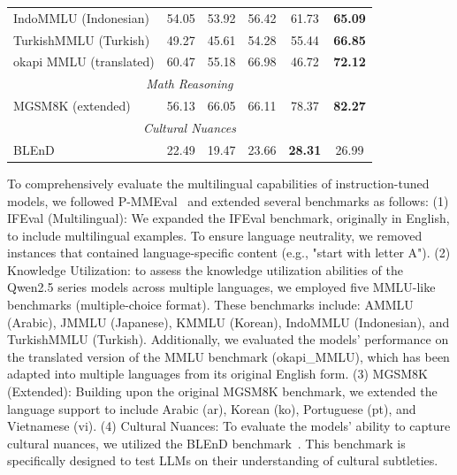 \begin{table}[t]
\begin{tabular}{@{}lccccc@{}}
IndoMMLU (Indonesian) & 54.05 & 53.92 & 56.42 & 61.73 & \textbf{65.09} \\

TurkishMMLU (Turkish) & 49.27 & 45.61 & 54.28 & 55.44 & \textbf{66.85} \\

okapi MMLU (translated) & 60.47 & 55.18 & 66.98 & 46.72 & \textbf{72.12} \\

\midrule

\multicolumn{6}{c}{\textit{Math Reasoning}} \\

\midrule

MGSM8K (extended) & 56.13 & 66.05 & 66.11 & 78.37 & \textbf{82.27} \\

\midrule

\multicolumn{6}{c}{\textit{Cultural Nuances}} \\

\midrule

BLEnD & 22.49 & 19.47 & 23.66 & \textbf{28.31} & 26.99 \\

\bottomrule

\end{tabular}

\end{table}

To comprehensively evaluate the multilingual capabilities of instruction-tuned models, we followed P-MMEval~\citep{pmmeval} and extended several benchmarks as follows:
(1) IFEval (Multilingual): We expanded the IFEval benchmark, originally in English, to include multilingual examples. To ensure language neutrality, we removed instances that contained language-specific content (e.g., "start with letter A"). 
(2) Knowledge Utilization: to assess the knowledge utilization abilities of the Qwen2.5 series models across multiple languages, we employed five MMLU-like benchmarks (multiple-choice format). These benchmarks include: AMMLU (Arabic), JMMLU (Japanese), KMMLU (Korean), IndoMMLU (Indonesian), and TurkishMMLU (Turkish). 
Additionally, we evaluated the models' performance on the translated version of the MMLU benchmark (okapi\_MMLU), which has been adapted into multiple languages from its original English form.
(3) MGSM8K (Extended): Building upon the original MGSM8K benchmark, we extended the language support to include Arabic (ar), Korean (ko), Portuguese (pt), and Vietnamese (vi). 
(4) Cultural Nuances: To evaluate the models' ability to capture cultural nuances, we utilized the BLEnD benchmark~\citep{blend}. This benchmark is specifically designed to test LLMs on their understanding of cultural subtleties. 

